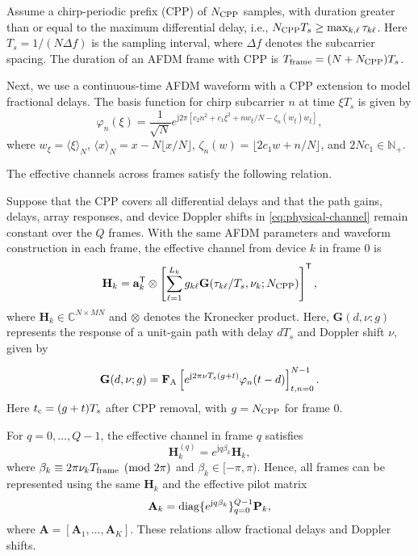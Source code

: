 Assume a chirp-periodic prefix (CPP) of $N_{\rm CPP}$ samples,
with duration greater than or equal to the maximum differential delay, i.e.,
$N_{\rm CPP}T_s\geq\max_{k,\ell}\tau_{k\ell}$.
Here $T_s=1/(N\Delta f)$ is the sampling interval, where $\Delta f$
denotes the subcarrier spacing.
The duration of an AFDM frame with CPP is $T_{\rm frame}=(N+N_{\rm CPP})T_s$.

Next, we use a continuous-time AFDM waveform
\cite{bemani2023thesis} with a CPP extension
\cite{bemani2022} to model fractional delays. The basis function for
chirp subcarrier $n$ at time $\xi T_s$ is given by
\begin{equation}
 \varphi_n(\xi)=\frac{1}{\sqrt N}
 e^{\mathrm j2\pi[c_2n^2+c_1\xi^2+nw_\xi/N-\zeta_n(w_\xi)w_\xi]},
 \label{eq:continuous-waveform}
\end{equation}
where $w_\xi=\langle\xi\rangle_N$,
$\langle x\rangle_N=x-N\lfloor x/N\rfloor$,
$\zeta_n(w)=\lfloor2c_1w+n/N\rfloor$, and $2Nc_1\in\mathbb N_+$.

The effective channels across frames satisfy the following relation.

\begin{proposition}
\label{prop:multiframe-channel}
Suppose that the CPP covers all differential delays and that the path
gains, delays, array responses, and device Doppler shifts in
\eqref{eq:physical-channel} remain constant over the $Q$ frames.
With the same AFDM parameters and waveform construction in each frame,
the effective channel from device $k$ in frame $0$ is
\begin{equation}
 \mathbf H_k=\mathbf a_k^{\mathsf T}\otimes
 \left[\sum_{\ell=1}^{L_k}g_{k\ell}
 \mathbf G(\tau_{k\ell}/T_s,\nu_k;N_{\rm CPP})\right]^{\mathsf T},
 \label{eq:channel}
\end{equation}
where $\mathbf H_k\in\mathbb C^{N\times MN}$ and $\otimes$ denotes
the Kronecker product. Here, $\mathbf G(d,\nu;g)$ represents the response
of a unit-gain path with delay $dT_s$ and Doppler shift $\nu$, given by

\begin{equation}
 \mathbf G(d,\nu;g)=\mathbf F_{\rm A}
 \left[e^{\mathrm j2\pi\nu T_s(g+t)}\varphi_n(t-d)\right]_{t,n=0}^{N-1}.
 \label{eq:path-operator-system}
\end{equation}
Here $t_{\rm c}=(g+t)T_s$ after CPP removal, with
$g=N_{\rm CPP}$ for frame $0$.

For $q=0,\ldots,Q-1$, the effective channel in frame $q$ satisfies
\begin{equation}
 \mathbf H_k^{(q)}=e^{\mathrm jq\beta_k}\mathbf H_k,
 \label{eq:twc-frame-channel}
\end{equation}
where $\beta_k\equiv2\pi\nu_kT_{\rm frame}\pmod{2\pi}$
and $\beta_k\in[-\pi,\pi)$.
Hence, all frames can be represented using the same $\mathbf H_k$ and
the effective pilot matrix
\begin{equation}
 \mathbf A_k=\operatorname{diag}\{e^{\mathrm jq\beta_k}\}_{q=0}^{Q-1}\mathbf P_k,
 \label{eq:effective-pilot}
\end{equation}
where $\mathbf A=[\mathbf A_1,\ldots,\mathbf A_K]$.
These relations allow fractional delays and Doppler shifts.
\end{proposition}

